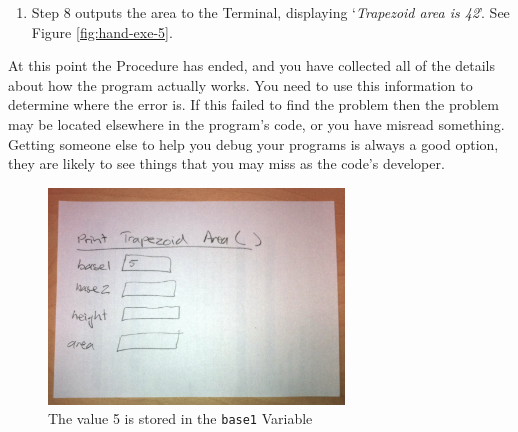 \begin{enumerate}
  \item Step 8 outputs the area to the Terminal, displaying `\emph{Trapezoid area is 42}'. See Figure \ref{fig:hand-exe-5}.
\end{enumerate} 

At this point the Procedure has ended, and you have collected all of the details about how the program actually works. You need to use this information to determine where the error is. If this failed to find the problem then the problem may be located elsewhere in the program's code, or you have misread something. Getting someone else to help you debug your programs is always a good option, they are likely to see things that you may miss as the code's developer.


\begin{figure}[htbp]
   \centering
   \includegraphics[width=0.7\textwidth]{./topics/storing-using-data/images/hand-exe-2} 
   \caption{The value 5 is stored in the \texttt{base1} Variable}
   \label{fig:hand-exe-2}
\end{figure}


